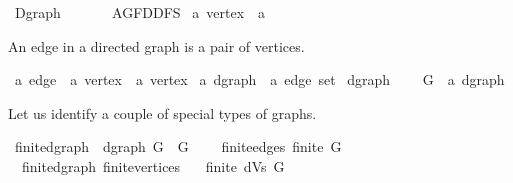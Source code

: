 %
\begin{isabellebody}%
%
%
\isadelimtheory
%
\endisadelimtheory
%
\isatagtheory
{}\isamarkupfalse%
\ Dgraph\isanewline
\ \ \isanewline
\ \ \ \ AGF{\isachardot}{\kern0pt}DDFS\isanewline
{}%
\endisatagtheory
{\isafoldtheory}%
%
\isadelimtheory
\isanewline
%
\endisadelimtheory
\isanewline
{}\isamarkupfalse%
\ {\isacharprime}{\kern0pt}a\ vertex\ {\isacharequal}{\kern0pt}\ {\isacharprime}{\kern0pt}a%
\begin{isamarkuptext}%
An edge in a directed graph is a pair of vertices.%
\end{isamarkuptext}\isamarkuptrue%
\isamarkupfalse%
\ {\isacharprime}{\kern0pt}a\ edge\ {\isacharequal}{\kern0pt}\ {\isachardoublequoteopen}{\isacharparenleft}{\kern0pt}{\isacharprime}{\kern0pt}a\ vertex\ {\isasymtimes}\ {\isacharprime}{\kern0pt}a\ vertex{\isacharparenright}{\kern0pt}{\isachardoublequoteclose}\isanewline
\isanewline
{}\isamarkupfalse%
\ {\isacharprime}{\kern0pt}a\ dgraph\ {\isacharequal}{\kern0pt}\ {\isachardoublequoteopen}{\isacharprime}{\kern0pt}a\ edge\ set{\isachardoublequoteclose}\isanewline
\isanewline
{}\isamarkupfalse%
\ dgraph\ {\isacharequal}{\kern0pt}\isanewline
\ \ \ G\ {\isacharcolon}{\kern0pt}{\isacharcolon}{\kern0pt}\ {\isachardoublequoteopen}{\isacharprime}{\kern0pt}a\ dgraph{\isachardoublequoteclose}%
\begin{isamarkuptext}%
Let us identify a couple of special types of graphs.%
\end{isamarkuptext}\isamarkuptrue%
\isamarkupfalse%
\ finite{\isacharunderscore}{\kern0pt}dgraph\ {\isacharequal}{\kern0pt}\ dgraph\ G\ \ G\ {\isacharplus}{\kern0pt}\isanewline
\ \ \ finite{\isacharunderscore}{\kern0pt}edges{\isacharcolon}{\kern0pt}\ {\isachardoublequoteopen}finite\ G{\isachardoublequoteclose}\isanewline
\isanewline
{}\isamarkupfalse%
\ {\isacharparenleft}{\kern0pt}\ finite{\isacharunderscore}{\kern0pt}dgraph{\isacharparenright}{\kern0pt}\ finite{\isacharunderscore}{\kern0pt}vertices{\isacharcolon}{\kern0pt}\isanewline
\ \ \ {\isachardoublequoteopen}finite\ {\isacharparenleft}{\kern0pt}dVs\ G{\isacharparenright}{\kern0pt}{\isachardoublequoteclose}\isanewline
%
\isadelimproof
\ \ %
\endisadelimproof
%

\end{isabellebody}
